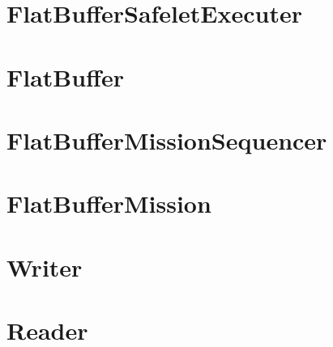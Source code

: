 \documentclass[10pt,a4paper,final]{article}
\begin{document}
\section{FlatBufferSafeletExecuter}

\pagebreak

\section{FlatBuffer}

\pagebreak

\section{FlatBufferMissionSequencer}

\pagebreak

\section{FlatBufferMission}

\pagebreak

\pagebreak

\section{Writer}

\pagebreak



\pagebreak

\section{Reader}

\pagebreak
\end{document}
